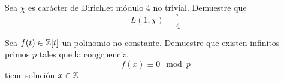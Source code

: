 \begin{sol}
	
\end{sol}

\begin{prob}[4 pts.]
	Sea $\chi$ es carácter de Dirichlet módulo 4 no trivial. Demuestre que
	\[L(1,\chi)=\frac\pi4\]
\end{prob}

\begin{sol}
	
\end{sol}

\begin{prob}[4 pts.]
	Sea $f(t)\in\mathbb{Z}[t]$ un polinomio no constante. Demuestre que existen infinitos primos $p$ tales que la congruencia
	\[f(x)\equiv 0\mod p\]
	tiene solución $x\in\mathbb{Z}$
\end{prob}

\begin{sol}
	
\end{sol}

